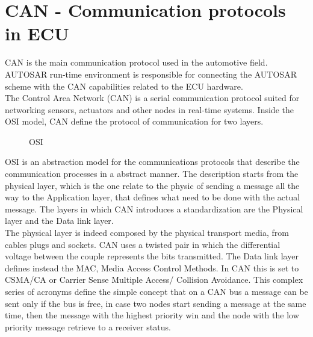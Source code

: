 \documentclass[../main.tex]{subfiles}
\begin{document}
\section{CAN - Communication protocols in ECU}
\gls{CAN} is the main communication protocol used in the automotive field. \gls{AUTOSAR} run-time environment is responsible for connecting the \gls{AUTOSAR} scheme with the \gls{CAN} capabilities related to the \gls{ECU} hardware.\\
The Control Area Network (\gls{CAN}) is a serial communication protocol suited for networking sensors, actuators and other nodes in real-time systems. Inside the \gls{OSI} model, \gls{CAN} define the protocol of communication for two layers. 
\begin{figure}[htbp]
    \centering
{}
    \caption{OSI}
    \label{fig:ECUstructure}
\end{figure}
\gls{OSI} is an abstraction model for the communications protocols that describe the communication processes in a abstract manner. The description starts from the physical layer, which is the one relate to the physic of sending a message all the way to the Application layer, that defines what need to be done with the actual message. The layers in which \gls{CAN} introduces a standardization are the Physical layer and the Data link layer.\\
The physical layer is indeed composed by the physical transport media, from cables plugs and sockets. \gls{CAN} uses a twisted pair in which the differential voltage between the couple represents the bits transmitted. The Data link layer defines instead the \gls{MAC}, Media Access Control Methods. In \gls{CAN} this is set to \gls{CSMA/CA} or Carrier Sense Multiple Access/ Collision Avoidance. This complex series of acronyms define the simple concept that on a \gls{CAN} \gls{bus} a message can be sent only if the \gls{bus} is free, in case two nodes start sending a message at the same time, then the message with the highest priority win and the node with the low priority message retrieve to a receiver status.
\end{document}
